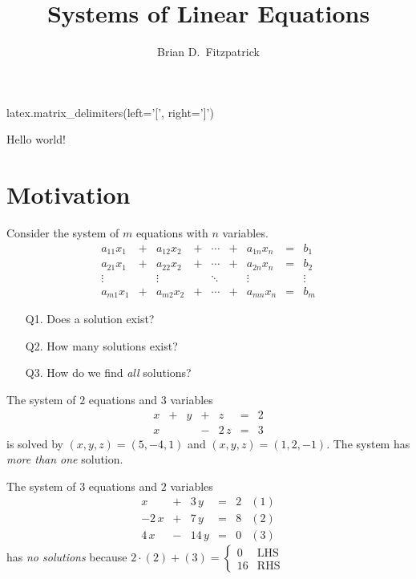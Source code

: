 \documentclass[12pt]{article}
\begin{document}
\title{Systems of Linear Equations}
\author{Brian D.\ Fitzpatrick}
\date{\cite[\S1.1]{peterson}}

\maketitle


\begin{sagesilent}
  latex.matrix_delimiters(left='[', right=']')
\end{sagesilent}

Hello world!

\section{Motivation}

Consider the system of $m$ equations with $n$ variables.
\begin{equation}\label{eq:motivation}
  \begin{array}{rcrcccrcr}
    a_{11}x_1 & + & a_{12}x_2 & + & \dotsb & + & a_{1n}x_n & = & b_1    \\
    a_{21}x_1 & + & a_{22}x_2 & + & \dotsb & + & a_{2n}x_n & = & b_2    \\
    \vdots    &   & \vdots    &   & \ddots &   & \vdots    &   & \vdots \\
    a_{m1}x_1 & + & a_{m2}x_2 & + & \dotsb & + & a_{mn}x_n & = & b_m
  \end{array}\tag{$\ast$}
\end{equation}
\begin{itemize}
\item[Q1.] Does a solution exist?
\item[Q2.] How many solutions exist?
\item[Q3.] How do we find \emph{all} solutions?
\end{itemize}

\begin{ex}
  The system of $2$ equations and $3$ variables
  \[
  \begin{array}{rcrcrcr}
    x & + & y & + & z    & = & 2  \\
    x &   &   & - & 2\,z & = & 3
  \end{array}
  \]
  is solved by $(x,y,z)=(5,-4,1)$ and $(x,y,z)=(1,2,-1)$. The system has
  \emph{more than one} solution.
\end{ex}

\begin{ex}
  The system of $3$ equations and $2$ variables
  \[
  \begin{array}{rcrcrr}
    x     & + & 3\,y  & = & 2 & (1)\\
    -2\,x & + & 7\,y  & = & 8 & (2)\\
    4\,x  & - & 14\,y & = & 0 & (3)
  \end{array}
  \]
  has \emph{no solutions} because
  $
  2\cdot(2)+(3)
  =
  \begin{cases}
    0 & \text{LHS} \\
    16 & \text{RHS}
  \end{cases}
  $
\end{ex}
\end{document}
